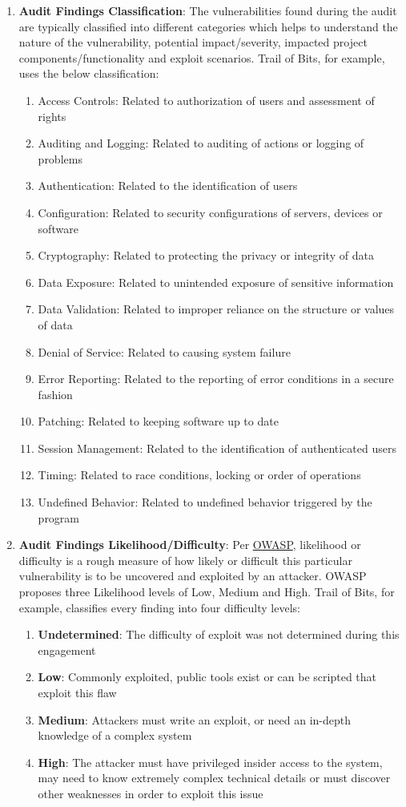 \begin{enumerate}
\item\textbf{Audit Findings Classification}: The vulnerabilities found during the audit are typically classified into different categories which helps to understand the nature of the vulnerability, potential impact/severity, impacted project components/functionality and exploit scenarios. Trail of Bits, for example, uses the below classification:
	\begin{enumerate}
	\item Access Controls: Related to authorization of users and assessment of rights
	\item Auditing and Logging: Related to auditing of actions or logging of problems
	\item Authentication: Related to the identification of users
	\item Configuration: Related to security configurations of servers, devices or software
	\item Cryptography: Related to protecting the privacy or integrity of data
	\item Data Exposure: Related to unintended exposure of sensitive information
	\item Data Validation: Related to improper reliance on the structure or values of data
	\item Denial of Service: Related to causing system failure
	\item Error Reporting: Related to the reporting of error conditions in a secure fashion
	\item Patching: Related to keeping software up to date
	\item Session Management: Related to the identification of authenticated users
	\item Timing: Related to race conditions, locking or order of operations
	\item Undefined Behavior: Related to undefined behavior triggered by the program
	\end{enumerate}

\item\textbf{Audit Findings Likelihood/Difficulty}: Per \href{https://owasp.org/www-community/OWASP_Risk_Rating_Methodology}{OWASP}, likelihood or difficulty is a rough measure of how likely or difficult this particular vulnerability is to be uncovered and exploited by an attacker. OWASP proposes three Likelihood levels of Low, Medium and High. Trail of Bits, for example, classifies every finding into four difficulty levels:
	\begin{enumerate}
	\item\textbf{Undetermined}: The difficulty of exploit was not determined during this engagement
	\item\textbf{Low}: Commonly exploited, public tools exist or can be scripted that exploit this flaw
	\item\textbf{Medium}: Attackers must write an exploit, or need an in-depth knowledge of a complex system
	\item\textbf{High}: The attacker must have privileged insider access to the system, may need to know extremely complex technical details or must discover other weaknesses in order to exploit this issue
	\end{enumerate}


\end{enumerate}
